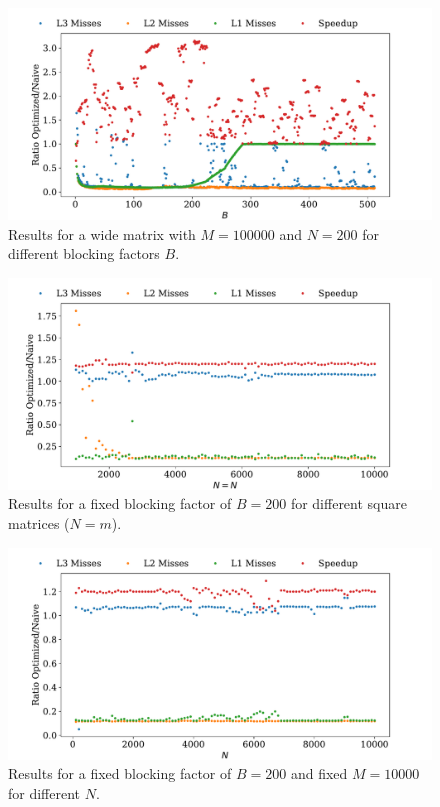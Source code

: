 \documentclass[a4paper, 11pt]{article}
\begin{document}
\begin{figure}
  \centering
  \includegraphics[width=\textwidth]{../plot/wide_against_B.pdf}
  \caption{Results for a wide matrix with $M=100000$ and $N=200$ for different blocking factors $B$.}
  \label{fig:wide_against_B}
\end{figure}

\begin{figure}
  \centering
  \includegraphics[width=\textwidth]{../plot/fixed_B_different_squares.pdf}
  \caption{Results for a fixed blocking factor of $B=200$ for different square matrices ($N = m$).}
  \label{fig:fixed_B_different_squares}
\end{figure}

\begin{figure}
  \centering
  \includegraphics[width=\textwidth]{../plot/fixed_B_M_different_N.pdf}
  \caption{Results for a fixed blocking factor of $B=200$ and fixed $M=10000$
  for different $N$.}
  \label{fig:fixed_B_M_different_N}
\end{figure}
\end{document}
